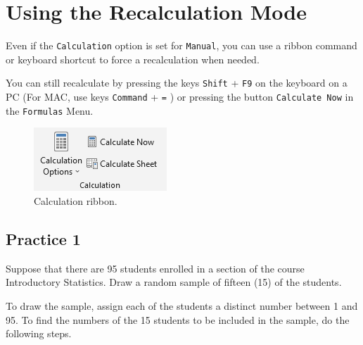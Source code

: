 \documentclass[
  12pt,
  letterpaper,
]{book}
\begin{document}
\hypertarget{using-the-recalculation-mode}{%
\section{Using the Recalculation Mode}\label{using-the-recalculation-mode}}

Even if the \texttt{Calculation} option is set for \texttt{Manual}, you can use a ribbon command or keyboard shortcut to force a recalculation when needed.

You can still recalculate by pressing the keys \texttt{Shift} + \texttt{F9} on the keyboard on a PC (For MAC, use keys \texttt{Command} + \texttt{=} ) or pressing the button \texttt{Calculate\ Now} in the \texttt{Formulas} Menu.

\begin{figure}

{\centering \includegraphics[width=0.3\linewidth]{images/recalc-pc} 

}

\caption{Calculation ribbon.}\label{fig:calculation-ribbons}
\end{figure}

\hypertarget{practice-1-1}{%
\subsection{Practice 1}\label{practice-1-1}}

Suppose that there are 95 students enrolled in a section of the course Introductory Statistics. Draw a random sample of fifteen (15) of the students.

To draw the sample, assign each of the students a distinct number between 1 and 95. To find the numbers of the 15 students to be included in the sample, do the following steps.
\end{document}
